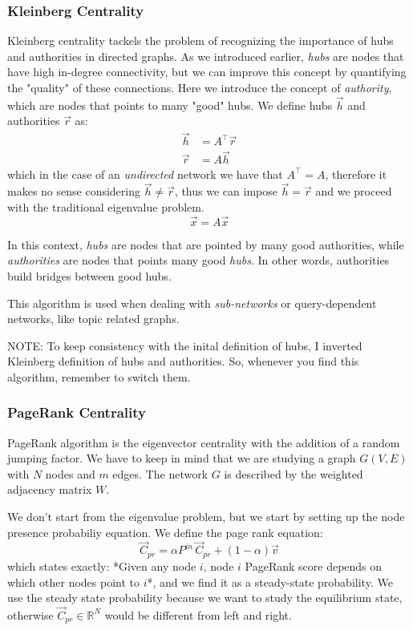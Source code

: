 \documentclass[12pt,a4paper]{article}
\begin{document}
\subsubsection*{Kleinberg Centrality}
Kleinberg centrality tackels the problem of recognizing the importance of hubs and authorities in directed graphs. As we introduced earlier, \textit{hubs} are nodes that have high in-degree connectivity, but we can improve this concept by quantifying the "quality" of these connections. Here we introduce the concept of \textit{authority}, which are nodes that points to many "good" hubs.
We define hubs $\vec{h}$ and authorities $\vec{r}$ as:
\begin{align*}
\vec{h} &= A^\intercal \vec{r}\\
\vec{r} &= A\vec{h}
\end{align*}
which in the case of an \textit{undirected} network we have that $A^\intercal =A$, therefore it makes no sense considering $\vec{h}\neq\vec{r}$, thus we can impose $\vec{h}=\vec{r}$ and we proceed with the traditional eigenvalue problem.
$$
\vec{x} = A\vec{x}
$$

In this context, \textit{hubs} are nodes that are pointed by many good authorities, while \textit{authorities} are nodes that points many good \textit{hubs}.
In other words, authorities build bridges between good hubs.

This algorithm is used when dealing with \textit{sub-networks} or query-dependent networks, like topic related graphs.

NOTE: To keep consistency with the inital definition of hubs, I inverted Kleinberg definition of hubs and authorities. So, whenever you find this algorithm, remember to switch them.

\subsubsection*{PageRank Centrality}
PageRank algorithm is the eigenvector centrality with the addition of a random jumping factor. We have to keep in mind that we are studying a graph $G(V,E)$ with $N$ nodes and $m$ edges. The network $G$ is described by the weighted adjacency matrix $W$.

We don't start from the eigenvalue problem, but we start by setting up the node presence probabiliy equation. We define the page rank equation:
$$
\vec{C}_{pr} = \alpha P^{in} \, \vec{C}_{pr} + (1-\alpha)\vec{v}
$$
which states exactly: *Given any node $i$, node $i$ PageRank score depends on which other nodes point to $i$*, and we find it as a steady-state probability. We use the steady state probability because we want to study the equilibrium state, otherwise $\vec{C}_{pr} \in \mathbb{R}^N$ would be different from left and right.
\end{document}
